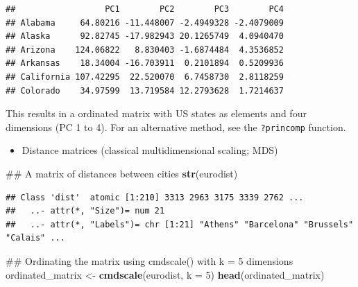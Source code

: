 \documentclass[]{book}
\newenvironment{Shaded}{\begin{snugshade}}{\end{snugshade}}
\newcommand{\KeywordTok}[1]{\textcolor[rgb]{0.13,0.29,0.53}{\textbf{#1}}}
\newcommand{\DataTypeTok}[1]{\textcolor[rgb]{0.13,0.29,0.53}{#1}}
\newcommand{\DecValTok}[1]{\textcolor[rgb]{0.00,0.00,0.81}{#1}}
\newcommand{\StringTok}[1]{\textcolor[rgb]{0.31,0.60,0.02}{#1}}
\newcommand{\OperatorTok}[1]{\textcolor[rgb]{0.81,0.36,0.00}{\textbf{#1}}}
\newcommand{\NormalTok}[1]{#1}
\providecommand{\tightlist}{%
  \setlength{\itemsep}{0pt}\setlength{\parskip}{0pt}}
\theoremstyle{definition}
\theoremstyle{definition}
\theoremstyle{remark}
\begin{document}
\begin{Shaded}
\end{Shaded}

\begin{verbatim}
##                  PC1        PC2        PC3        PC4
## Alabama     64.80216 -11.448007 -2.4949328 -2.4079009
## Alaska      92.82745 -17.982943 20.1265749  4.0940470
## Arizona    124.06822   8.830403 -1.6874484  4.3536852
## Arkansas    18.34004 -16.703911  0.2101894  0.5209936
## California 107.42295  22.520070  6.7458730  2.8118259
## Colorado    34.97599  13.719584 12.2793628  1.7214637
\end{verbatim}

This results in a ordinated matrix with US states as elements and four
dimensions (PC 1 to 4). For an alternative method, see the
\texttt{?princomp} function.

\begin{itemize}
\tightlist
\item
  Distance matrices (classical multidimensional scaling; MDS)
\end{itemize}

\begin{Shaded}
\begin{Highlighting}[]
\NormalTok{## A matrix of distances between cities}
\KeywordTok{str}\NormalTok{(eurodist)}
\end{Highlighting}
\end{Shaded}

\begin{verbatim}
## Class 'dist'  atomic [1:210] 3313 2963 3175 3339 2762 ...
##   ..- attr(*, "Size")= num 21
##   ..- attr(*, "Labels")= chr [1:21] "Athens" "Barcelona" "Brussels" "Calais" ...
\end{verbatim}

\begin{Shaded}
\begin{Highlighting}[]
\NormalTok{## Ordinating the matrix using cmdscale() with k = 5 dimensions }
\NormalTok{ordinated_matrix <-}\StringTok{ }\KeywordTok{cmdscale}\NormalTok{(eurodist, }\DataTypeTok{k =} \DecValTok{5}\NormalTok{)}
\KeywordTok{head}\NormalTok{(ordinated_matrix)}
\end{Highlighting}
\end{Shaded}
\end{document}
